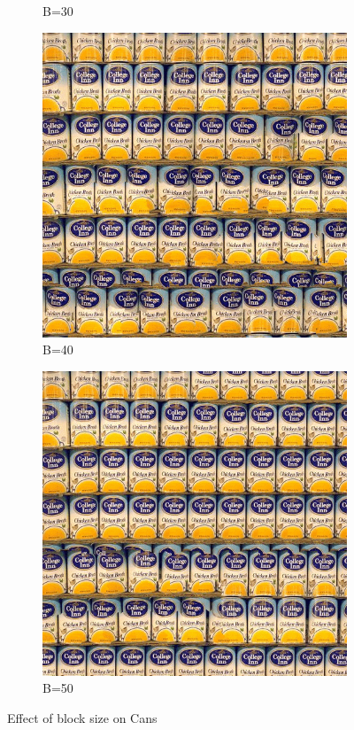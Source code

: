 \documentclass[10pt,twocolumn,letterpaper]{article}
\begin{document}
\begin{figure}[h]
\begin{subfigure}[h]{0.2\textwidth}
       \caption{B=30}
   \end{subfigure}
   \hfill
   \begin{subfigure}[h]{0.2\textwidth}
       \centering
       \includegraphics[scale=0.15]{../results/syn/out_cans_B_40.png}
       \caption{B=40}
   \end{subfigure}
   \begin{subfigure}[h]{0.2\textwidth}
       \centering
       \includegraphics[scale=0.15]{../results/syn/out_cans_B_50.png}
       \caption{B=50}
   \end{subfigure}
   \caption{Effect of block size on Cans}
   \label{fig:cans_bs}
\end{figure}
\end{document}
